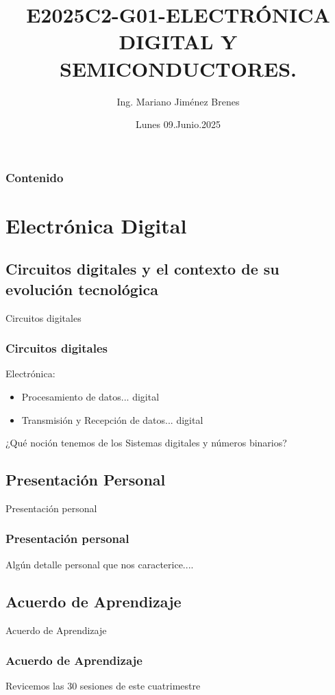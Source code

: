 \documentclass[11pt]{beamer}
\author{Ing. Mariano Jim\'enez Brenes}
\title
{
E2025C2-G01-ELECTRÓNICA DIGITAL Y SEMICONDUCTORES.
}
\institute{
Universidad Castro Carazo\linebreak
T\'ecnico En Semiconductores
}
\date{Lunes 09.Junio.2025}
\begin{document}
\begin{frame}
\maketitle 
\end{frame}

\logo{}

\begin{frame}
\frametitle{Contenido}
\tableofcontents
\end{frame}


\section{Electr\'onica Digital}
\subsection{Circuitos digitales y el
contexto de su evoluci\'on
tecnol\'ogica}
\begin{frame}{Circuitos digitales}
\frametitle{Circuitos digitales}
Electr\'onica:
	\begin{itemize}
		\item Procesamiento de datos... digital
		\item Transmisi\'on y Recepci\'on de datos... digital
	\end{itemize}
	¿Qu\'e noci\'on tenemos de los Sistemas digitales y n\'umeros binarios?
\end{frame}
\subsection{Presentaci\'on Personal}
\begin{frame}{Presentaci\'on personal}
\frametitle{Presentaci\'on personal}
Alg\'un detalle personal que nos caracterice....
\end{frame}
\subsection{Acuerdo de Aprendizaje}
\begin{frame}{Acuerdo de Aprendizaje}
\frametitle{Acuerdo de Aprendizaje}
Revicemos las 30 sesiones de este cuatrimestre
\end{frame}
\end{document}
